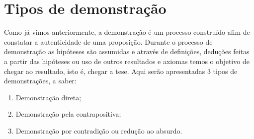 \section{Tipos de demonstração}

Como já vimos anteriormente, a demonstração  é um processo construído afim de
constatar a autenticidade de uma proposição. Durante o processo de
demonstração as hipóteses são assumidas e através de definições, deduções
feitas a partir das hipóteses ou uso de outros resultados e axiomas temos o
objetivo de chegar ao resultado, isto é, chegar a tese.
Aqui serão apresentadas 3 tipos de demonstrações, a saber:
\begin{enumerate}
    \item Demonstração direta;
    \item Demonstração pela contrapositiva;
    \item Demonstração por contradição ou redução ao absurdo.
\end{enumerate}

